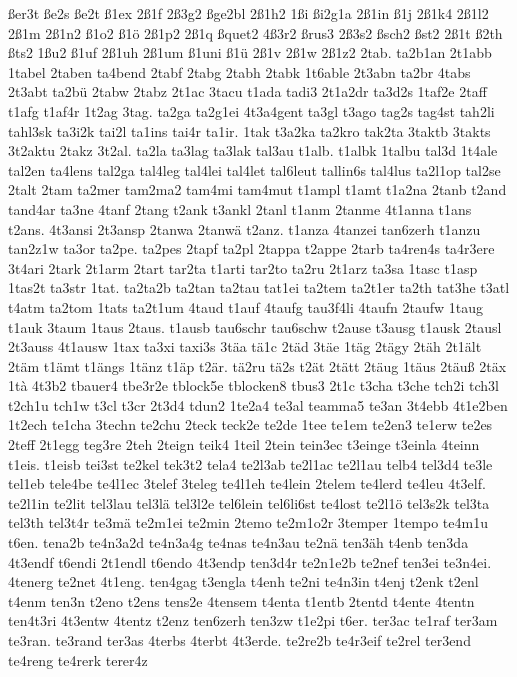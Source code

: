 {ßer3t
ße2s
ße2t
ß1ex
2ß1f
2ß3g2
ßge2bl
2ß1h2
1ßi
ßi2g1a
2ß1in
ß1j
2ß1k4
2ß1l2
2ß1m
2ß1n2
ß1o2
ß1ö
2ß1p2
2ß1q
ßquet2
4ß3r2
ßrus3
2ß3s2
ßsch2
ßst2
2ß1t
ß2th
ßts2
1ßu2
ß1uf
2ß1uh
2ß1um
ß1uni
ß1ü
2ß1v
2ß1w
2ß1z2
2tab.
ta2b1an
2t1abb
1tabel
2taben
ta4bend
2tabf
2tabg
2tabh
2tabk
1t6able
2t3abn
ta2br
4tabs
2t3abt
ta2bü
2tabw
2tabz
2t1ac
3tacu
t1ada
tadi3
2t1a2dr
ta3d2s
1taf2e
2taff
t1afg
t1af4r
1t2ag
3tag.
ta2ga
ta2g1ei
4t3a4gent
ta3gl
t3ago
tag2s
tag4st
tah2li
tahl3sk
ta3i2k
tai2l
ta1ins
tai4r
ta1ir.
1tak
t3a2ka
ta2kro
tak2ta
3taktb
3takts
3t2aktu
2takz
3t2al.
ta2la
ta3lag
ta3lak
tal3au
t1alb.
t1albk
1talbu
tal3d
1t4ale
tal2en
ta4lens
tal2ga
tal4leg
tal4lei
tal4let
tal6leut
tallin6s
tal4lus
ta2l1op
tal2se
2talt
2tam
ta2mer
tam2ma2
tam4mi
tam4mut
t1ampl
t1amt
t1a2na
2tanb
t2and
tand4ar
ta3ne
4tanf
2tang
t2ank
t3ankl
2tanl
t1anm
2tanme
4t1anna
t1ans
t2ans.
4t3ansi
2t3ansp
2tanwa
2tanwä
t2anz.
t1anza
4tanzei
tan6zerh
t1anzu
tan2z1w
ta3or
ta2pe.
ta2pes
2tapf
ta2pl
2tappa
t2appe
2tarb
ta4ren4s
ta4r3ere
3t4ari
2tark
2t1arm
2tart
tar2ta
t1arti
tar2to
ta2ru
2t1arz
ta3sa
1tasc
t1asp
1tas2t
ta3str
1tat.
ta2ta2b
ta2tan
ta2tau
tat1ei
ta2tem
ta2t1er
ta2th
tat3he
t3atl
t4atm
ta2tom
1tats
ta2t1um
4taud
t1auf
4taufg
tau3f4li
4taufn
2taufw
1taug
t1auk
3taum
1taus
2taus.
t1ausb
tau6schr
tau6schw
t2ause
t3ausg
t1ausk
2tausl
2t3auss
4t1ausw
1tax
ta3xi
taxi3s
3täa
tä1c
2täd
3täe
1täg
2tägy
2täh
2t1ält
2täm
t1ämt
t1ängs
1tänz
t1äp
t2är.
tä2ru
tä2s
t2ät
2tätt
2täug
1täus
2täuß
2täx
1tà
4t3b2
tbauer4
tbe3r2e
tblock5e
tblocken8
tbus3
2t1c
t3cha
t3che
tch2i
tch3l
t2ch1u
tch1w
t3cl
t3cr
2t3d4
tdun2
1te2a4
te3al
teamma5
te3an
3t4ebb
4t1e2ben
1t2ech
te1cha
3techn
te2chu
2teck
teck2e
te2de
1tee
te1em
te2en3
te1erw
te2es
2teff
2t1egg
teg3re
2teh
2teign
teik4
1teil
2tein
tein3ec
t3einge
t3einla
4teinn
t1eis.
t1eisb
tei3st
te2kel
tek3t2
tela4
te2l3ab
te2l1ac
te2l1au
telb4
tel3d4
te3le
tel1eb
tele4be
te4l1ec
3telef
3teleg
te4l1eh
te4lein
2telem
te4lerd
te4leu
4t3elf.
te2l1in
te2lit
tel3lau
tel3lä
tel3l2e
tel6lein
tel6li6st
te4lost
te2l1ö
tel3s2k
tel3ta
tel3th
tel3t4r
te3mä
te2m1ei
te2min
2temo
te2m1o2r
3temper
1tempo
te4m1u
t6en.
tena2b
te4n3a2d
te4n3a4g
te4nas
te4n3au
te2nä
ten3äh
t4enb
ten3da
4t3endf
t6endi
2t1endl
t6endo
4t3endp
ten3d4r
te2n1e2b
te2nef
ten3ei
te3n4ei.
4tenerg
te2net
4t1eng.
ten4gag
t3engla
t4enh
te2ni
te4n3in
t4enj
t2enk
t2enl
t4enm
ten3n
t2eno
t2ens
tens2e
4tensem
t4enta
t1entb
2tentd
t4ente
4tentn
ten4t3ri
4t3entw
4tentz
t2enz
ten6zerh
ten3zw
t1e2pi
t6er.
ter3ac
te1raf
ter3am
te3ran.
te3rand
ter3as
4terbs
4terbt
4t3erde.
te2re2b
te4r3eif
te2rel
ter3end
te4reng
te4rerk
terer4z
}
